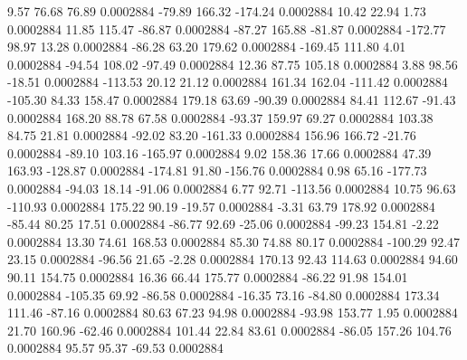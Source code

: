         9.57       76.68       76.89     0.0002884
      -79.89      166.32     -174.24     0.0002884
       10.42       22.94        1.73     0.0002884
       11.85      115.47      -86.87     0.0002884
      -87.27      165.88      -81.87     0.0002884
     -172.77       98.97       13.28     0.0002884
      -86.28       63.20      179.62     0.0002884
     -169.45      111.80        4.01     0.0002884
      -94.54      108.02      -97.49     0.0002884
       12.36       87.75      105.18     0.0002884
        3.88       98.56      -18.51     0.0002884
     -113.53       20.12       21.12     0.0002884
      161.34      162.04     -111.42     0.0002884
     -105.30       84.33      158.47     0.0002884
      179.18       63.69      -90.39     0.0002884
       84.41      112.67      -91.43     0.0002884
      168.20       88.78       67.58     0.0002884
      -93.37      159.97       69.27     0.0002884
      103.38       84.75       21.81     0.0002884
      -92.02       83.20     -161.33     0.0002884
      156.96      166.72      -21.76     0.0002884
      -89.10      103.16     -165.97     0.0002884
        9.02      158.36       17.66     0.0002884
       47.39      163.93     -128.87     0.0002884
     -174.81       91.80     -156.76     0.0002884
        0.98       65.16     -177.73     0.0002884
      -94.03       18.14      -91.06     0.0002884
        6.77       92.71     -113.56     0.0002884
       10.75       96.63     -110.93     0.0002884
      175.22       90.19      -19.57     0.0002884
       -3.31       63.79      178.92     0.0002884
      -85.44       80.25       17.51     0.0002884
      -86.77       92.69      -25.06     0.0002884
      -99.23      154.81       -2.22     0.0002884
       13.30       74.61      168.53     0.0002884
       85.30       74.88       80.17     0.0002884
     -100.29       92.47       23.15     0.0002884
      -96.56       21.65       -2.28     0.0002884
      170.13       92.43      114.63     0.0002884
       94.60       90.11      154.75     0.0002884
       16.36       66.44      175.77     0.0002884
      -86.22       91.98      154.01     0.0002884
     -105.35       69.92      -86.58     0.0002884
      -16.35       73.16      -84.80     0.0002884
      173.34      111.46      -87.16     0.0002884
       80.63       67.23       94.98     0.0002884
      -93.98      153.77        1.95     0.0002884
       21.70      160.96      -62.46     0.0002884
      101.44       22.84       83.61     0.0002884
      -86.05      157.26      104.76     0.0002884
       95.57       95.37      -69.53     0.0002884
